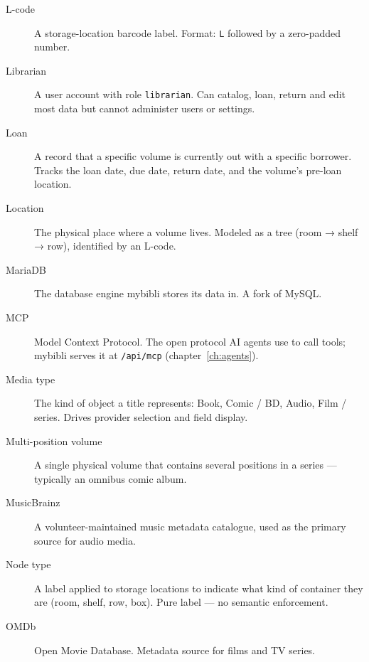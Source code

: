 \begin{description}
  \item[L-code] A storage-location barcode label.
        Format: \texttt{L} followed by a zero-padded number.

  \item[Librarian] A user account with role
        \texttt{librarian}. Can catalog, loan, return and edit
        most data but cannot administer users or settings.

  \item[Loan] A record that a specific volume is
        currently out with a specific borrower. Tracks the loan
        date, due date, return date, and the volume's pre-loan
        location.

  \item[Location] The physical place where a
        volume lives. Modeled as a tree (room → shelf → row),
        identified by an L-code.

  \item[MariaDB] The database engine mybibli stores its data in.
        A fork of MySQL.

  \item[MCP] Model Context Protocol. The open protocol AI
        agents use to call tools; mybibli serves it at
        \texttt{/api/mcp} (chapter~\ref{ch:agents}).

  \item[Media type] The kind of object a title
        represents: Book, Comic / BD, Audio, Film / series. Drives
        provider selection and field display.

  \item[Multi-position volume] A single
        physical volume that contains several positions in a
        series — typically an omnibus comic album.

  \item[MusicBrainz] A volunteer-maintained
        music metadata catalogue, used as the primary source for
        audio media.

  \item[Node type] A label applied to storage
        locations to indicate what kind of container they are
        (room, shelf, row, box). Pure label — no semantic
        enforcement.

  \item[OMDb] Open Movie Database. Metadata source
        for films and TV series.


\end{description}
